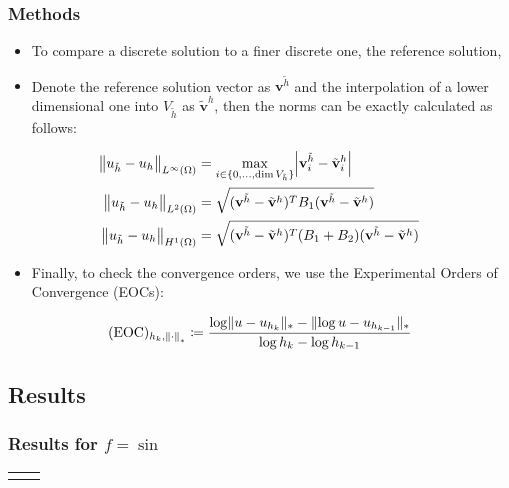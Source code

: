\begin{frame}
	\frametitle{Methods}
	\begin{itemize}
		\item To compare a discrete solution to a finer discrete one, the reference solution,
		\item Denote the reference solution vector as $\mathbf{v}^{\tilde{h}}$ and the interpolation of a lower dimensional one into $V_{\tilde{h}}$ as $\tilde{\mathbf{v}}^h$, then the norms can be exactly calculated as follows:
	\end{itemize}
\vspace{-0.7cm}
\begin{align}
	\norm{u_{\tilde{h}} - u_h}_{L^\infty(\Omega)} &= \max_{i \in \{0,\dots,\mathrm{dim} \, V_{\tilde{h}}\}} \abs{\mathbf{v}^{\tilde{h}}_i - \tilde{\mathbf{v}}^h_i} \\
	\norm{u_{\tilde{h}} - u_h}_{L^2(\Omega)} &=  \sqrt{(\mathbf{v}^{\tilde{h}} - \tilde{\mathbf{v}}^h)^T B_1 (\mathbf{v}^{\tilde{h}} - \tilde{\mathbf{v}}^h)}\\
	\norm{u_{\tilde{h}} - u_h}_{H^1(\Omega)} &= \sqrt{(\mathbf{v}^{\tilde{h}} - \tilde{\mathbf{v}}^h)^T (B_1+B_2) (\mathbf{v}^{\tilde{h}} - \tilde{\mathbf{v}}^h)}
\end{align}
\vspace{-1cm}
\begin{itemize}
	\item Finally, to check the convergence orders, we use the Experimental Orders of Convergence (EOCs):
\end{itemize}
\begin{equation}
	(\mathrm{EOC})_{h_k,\,\norm{\cdot}_*} \coloneqq \frac{\log \lVert u-u_{h_k}\rVert_* - \lVert\log u-u_{h_{k-1}}\rVert_* }{\log h_k - \log h_{k-1}}
\end{equation}
\end{frame}

\subsection{Results}
\begin{frame}[c]
	\centering
	\frametitle{Results for $f = \sin$}
		\begin{tabular}{c@{\hskip -1em}c}
			 & 	
		\end{tabular}
\end{frame}

